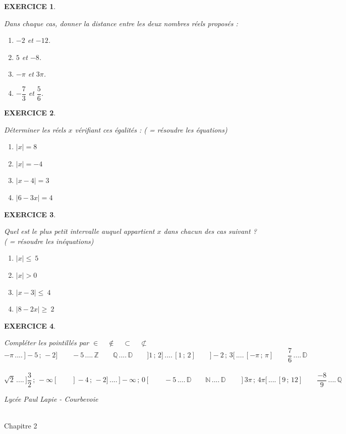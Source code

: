 \documentclass[a4paper]{article}   %
\renewcommand{\(}{\left(}
\renewcommand{\)}{\right)}
\newtheorem{EXO}{\large EXERCICE }
\newenvironment{EX}   { \setcounter{ques}{0} \begin{EXO} \hrulefill ~\vspace{0.3cm}

\normalfont}    {\end{EXO} \medskip}
\newcommand{\ie}{\leqslant ~}  		%
\newcommand{\se}{\geqslant~} 		%
\newcommand{\f}{\dfrac} 	%
\def\cl{{\Large \bf{2nde}}}
\begin{document}
\begin{EX} Dans chaque cas, donner la distance entre les deux nombres réels proposés :
\begin{enumerate}
\item $-2$ et $-12$.
\item $5$ et $-8$.
\item $-\pi$ et $3 \pi$.
\item $-\f{7}{3}$ et $\f{5}{6}$.
\end{enumerate}
\end{EX}
\begin{EX} Déterminer les réels $x$ vérifiant ces égalités : ( = résoudre les équations)
\begin{enumerate}
\item $|x|=8$
\item $|x|=-4$
\item $|x-4|=3$
\item $|6-3x|=4$
\end{enumerate}
\end{EX}
\begin{EX} Quel est le plus petit intervalle auquel appartient $x$ dans chacun des cas suivant ? ( = résoudre les inéquations)
\begin{enumerate}
\item $|x| \ie 5$
\item $|x| > 0 $
\item $|x-3| \ie 4$
\item $|8-2x| \se 2$
\end{enumerate}
\end{EX}
\begin{EX} Compléter les pointillés par $\in \quad \notin \quad \subset \quad \not\subset$ 
$$ -\pi \, .... \,]-5 \,;\, -2] \qquad -5 \,.... \,\mathbb{Z} \qquad \mathbb{Q} \,....\, \mathbb{D} \qquad ]1\,;\, 2] \,....\, [1 \,;\,2] \qquad ]-2 \,;\, 3[ \, .... \, [- \pi \,;\, \pi]\qquad \f{7}{6}\, ....\, \mathbb{D} $$ ~~
$$ \sqrt2 \, .... \,]\f{3}{2} \,;\, -\infty[ \qquad ]-4\,;\, -2] \,....\, ]-\infty \,;\,0[\qquad -5 \,.... \,\mathbb{D} \qquad \mathbb{N} \,....\, \mathbb{D}  \qquad ]3\pi \,;\, 4\pi[ \, .... \, [9 \,;\, 12]\qquad \f{-8}{9}\, ....\, \mathbb{Q}  $$
\end{EX}

\newpage \setcounter{EXO}{0}
\noindent\begin{minipage}{.20\linewidth}\begin{center}                   %
\noindent \emph{Lycée Paul Lapie - Courbevoie}
\end{center}\end{minipage}
\begin{minipage}{1.5\linewidth}\begin{center}		%
\noindent \cl\\ Chapitre 2
\end{center}\end{minipage}
\end{document}
